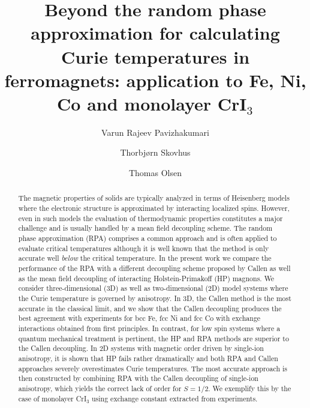 \documentclass[aps,prb,reprint,floatfix,superscriptaddress]{revtex4-2}
\begin{document}
\title{Beyond the random phase approximation for calculating Curie temperatures in ferromagnets: application to Fe, Ni, Co and monolayer CrI$_3$}

\author{Varun Rajeev Pavizhakumari} 
\author{Thorbjørn Skovhus} 
\author{Thomas Olsen} 


\begin{abstract}
The magnetic properties of solids are typically analyzed in terms of Heisenberg models where the electronic structure is approximated by interacting localized spins. However, even in such models the evaluation of thermodynamic properties constitutes a major challenge and is usually handled by a mean field decoupling scheme. The random phase approximation (RPA) comprises a common approach and is often applied to evaluate critical temperatures although it is well known that the method is only accurate well \textit{below} the critical temperature. In the present work we compare the performance of the RPA with a different decoupling scheme proposed by Callen as well as the mean field decoupling of interacting Holstein-Primakoff (HP) magnons. We consider three-dimensional (3D) as well as two-dimensional (2D) model systems where the Curie temperature is governed by anisotropy. In 3D, the Callen method is the most accurate in the classical limit, and we show that the Callen decoupling produces the best agreement with experiments for bcc Fe, fcc Ni and fcc Co with exchange interactions obtained from first principles. In contrast, for low spin systems where a  quantum mechanical treatment is pertinent, the HP and RPA methods are superior to the Callen decoupling. In 2D systems with magnetic order driven by single-ion anisotropy, it is shown that HP fails rather dramatically and both RPA and Callen approaches severely overestimates Curie temperatures. The most accurate approach is then constructed by combining RPA with the Callen decoupling of single-ion anisotropy, which yields the correct lack of order for $S=1/2$. We exemplify this by the case of monolayer CrI$_3$ using exchange constant extracted from experiments.
\end{abstract}
\end{document}

